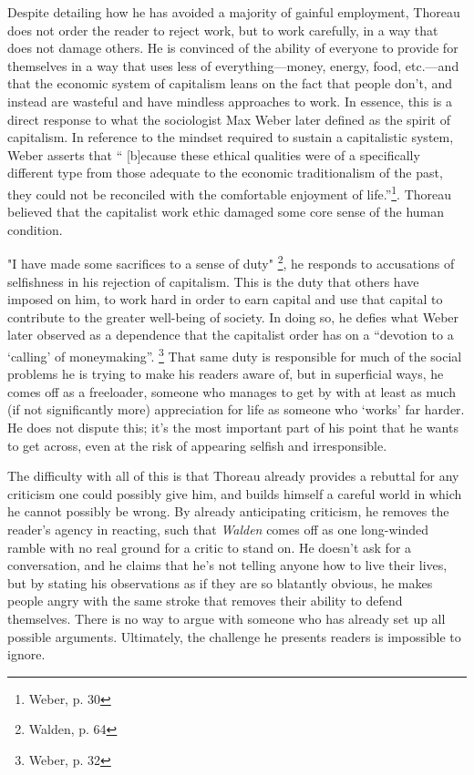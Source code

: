 Despite detailing how he has avoided a majority of gainful employment, Thoreau
does not order the reader to reject work, but to work carefully, in a way that
does not damage others. He is convinced of the ability of everyone to provide
for themselves in a way that uses less of everything---money, energy, food,
etc.---and that the economic system of capitalism leans on the fact that
people don't, and instead are wasteful and have mindless approaches to work.
In essence, this is a direct response to what the sociologist Max Weber
later defined as the spirit of capitalism. In reference to the mindset
required to sustain a capitalistic system, Weber asserts that `` [b]ecause
these ethical qualities were of a specifically different type from those
adequate to the economic traditionalism of the past, they could not be
reconciled with the comfortable enjoyment of life.''\footnote{Weber, p. 30}.
Thoreau believed that the capitalist work ethic damaged some core sense of the
human condition.

"I have made some sacrifices to a sense of duty" \footnote{Walden, p. 64}, he responds to
accusations of selfishness in his rejection of capitalism. This is the duty that others have imposed on him,
to work hard in order to earn capital and use that capital to contribute to
the greater well-being of society. In doing so, he defies what Weber later
observed as a dependence that the capitalist order has on a ``devotion to a
`calling' of moneymaking''. \footnote{Weber, p. 32} That same duty is responsible for much of the social problems he is trying to make his readers aware of, but in superficial ways, he
comes off as a freeloader, someone who manages to get by with at least as
much (if not significantly more) appreciation for life as someone who `works'
far harder. He does not dispute this; it's the most important part of his
point that he wants to get across, even at the risk of appearing selfish and
irresponsible.

The difficulty with all of this is that Thoreau already provides a rebuttal for
any criticism one could possibly give him, and builds himself a careful world
in which he cannot possibly be wrong. By already anticipating criticism, he
removes the reader's agency in reacting, such that \textit{Walden} comes off as one long-winded
ramble with no real ground for a critic to stand on. He doesn't ask for
a conversation, and he claims that he's not telling anyone how to live their
lives, but by stating his observations as if they are so blatantly obvious, he
makes people angry with the same stroke that removes their ability to defend
themselves. There is no way to argue with someone who has already set up all
possible arguments. Ultimately, the challenge he presents readers is
impossible to ignore.

